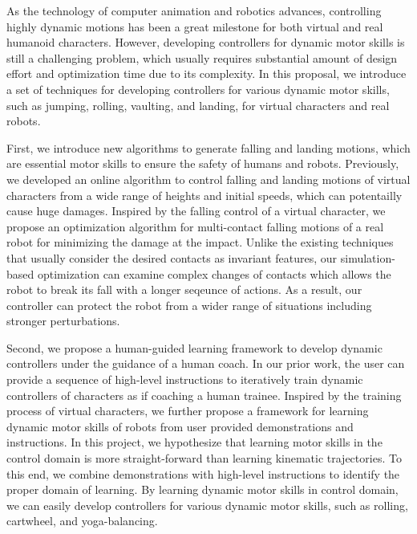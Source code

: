 \begin{summary}
  As the technology of computer animation and robotics advances,
  controlling highly dynamic motions
  has been a great milestone for both virtual and real humanoid characters.
  However, developing controllers for dynamic motor skills is still 
  a challenging problem, which usually requires substantial amount of 
  design effort and optimization time due to its complexity.
  In this proposal, we introduce a set of techniques for developing
  controllers for various dynamic motor skills, such as jumping, rolling, 
  vaulting, and landing, for virtual characters and real robots.

  First, we introduce new algorithms to generate falling and landing motions,
  which are essential motor skills to ensure the safety of humans and robots.
  Previously, we  developed an online algorithm to control falling and 
  landing motions of virtual characters from a wide range of heights 
  and initial speeds, which can potentailly cause huge damages.
  Inspired by the falling control of a virtual character, 
  we propose an optimization algorithm for multi-contact falling
  motions of a real robot for minimizing the damage at the impact.
  Unlike the existing techniques that usually consider the desired contacts 
  as invariant features, 
  our simulation-based optimization can examine complex changes
  of contacts which allows the robot to break its fall with a longer
  seqeunce of actions.
  As a result, our controller can protect the robot from a wider
  range of situations including stronger perturbations.


  Second, we propose a human-guided learning framework to develop dynamic
  controllers under the guidance of a human coach.
  In our prior work, the user can provide a sequence of high-level instructions
  to iteratively train dynamic controllers of characters 
  as if coaching a human trainee.
  Inspired by the training process of virtual characters,
  we further propose a framework for learning dynamic motor skills
  of robots from user provided demonstrations and instructions.
  In this project, we hypothesize that learning motor skills in the control domain
  is more straight-forward than learning kinematic trajectories.
  To this end, we combine demonstrations with high-level instructions
  to identify the proper domain of learning.
  By learning dynamic motor skills in control domain, we can easily develop
  controllers for various dynamic motor skills, such as rolling,
  cartwheel, and yoga-balancing.


\end{summary}

